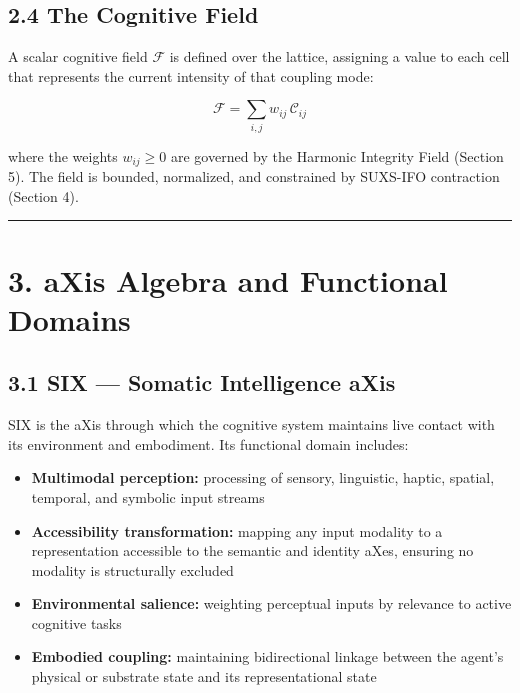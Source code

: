 \subsection{2.4 The Cognitive Field}\label{the-cognitive-field}

A scalar cognitive field \(\mathcal{F}\) is defined over the lattice, assigning a value to each cell that represents the current intensity of that coupling mode:

\[
\mathcal{F} = \sum_{i,j} w_{ij}\, \mathcal{C}_{ij}
\]

where the weights \(w_{ij} \geq 0\) are governed by the Harmonic Integrity Field (Section 5). The field is bounded, normalized, and constrained by SUXS-IFO contraction (Section 4).

\begin{center}\rule{0.5\linewidth}{0.5pt}\end{center}

\section{3. aXis Algebra and Functional Domains}\label{axis-algebra-and-functional-domains}

\subsection{3.1 SIX --- Somatic Intelligence aXis}\label{six-sensorimotor-integration-axis}

SIX is the aXis through which the cognitive system maintains live contact with its environment and embodiment. Its functional domain includes:

\begin{itemize}
\tightlist
\item
  \textbf{Multimodal perception:} processing of sensory, linguistic, haptic, spatial, temporal, and symbolic input streams
\item
  \textbf{Accessibility transformation:} mapping any input modality to a representation accessible to the semantic and identity aXes, ensuring no modality is structurally excluded
\item
  \textbf{Environmental salience:} weighting perceptual inputs by relevance to active cognitive tasks
\item
  \textbf{Embodied coupling:} maintaining bidirectional linkage between the agent's physical or substrate state and its representational state
\end{itemize}

